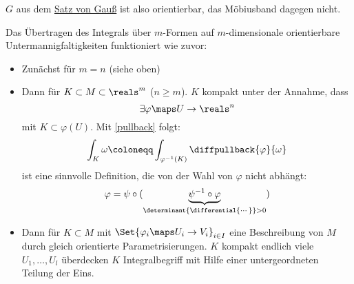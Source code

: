 \begin{beispiel}
  \( G \) aus dem \hyperref[integralsatz_gauss]{Satz von Gauß} ist also orientierbar, das Möbiusband dagegen nicht.
\end{beispiel}

\begin{bemerkung}
  Das Übertragen des Integrals über \( m \)-Formen auf \( m \)-dimensionale orientierbare Untermannigfaltigkeiten funktioniert wie zuvor:
  \begin{itemize}
      \item Zunächst für \( m=n \) (siehe oben)
      \item Dann für \( K\subset M\subset\reals^m \) (\( n\ge m \)).
      \( K \) kompakt unter der Annahme, dass 
      \begin{equation*}
          \exists \varphi\maps U\to \reals^n
      \end{equation*}
      mit \( K\subset \varphi(U) \). Mit \ref{pullback} folgt:
      \begin{equation*}
          \int_K \omega\coloneqq \int_{\varphi^{-1}(K)}\diffpullback{\varphi}{\omega}
      \end{equation*}
      ist eine sinnvolle Definition, die von der Wahl von \( \varphi \) nicht abhängt:
      \begin{equation*}
          \varphi=\psi\circ(\underbrace{\psi^{-1}\circ\varphi}_{\determinant{\differential{\dotsb }}>0})
      \end{equation*}
      \item Dann für \( K\subset M \) mit \( \Set{\varphi_i\maps U_i\to V_i}_{i\in I} \) eine Beschreibung von \( M \) durch gleich orientierte Parametrisierungen.
      \( K \) kompakt \timplies endlich viele \( U_1,\dotsc ,U_l \) überdecken \( K \) \timplies Integralbegriff mit Hilfe einer untergeordneten Teilung der Eins.
  \end{itemize}
\end{bemerkung}

